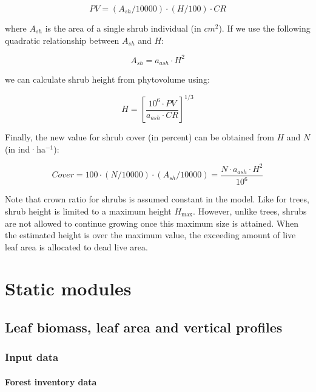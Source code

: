 \documentclass[]{book}
\begin{document}
\begin{equation}
PV =  (A_{sh}/10000) \cdot (H/100) \cdot CR
\end{equation}

where \(A_{sh}\) is the area of a single shrub individual (in \(cm^2\)).
If we use the following quadratic relationship between \(A_{sh}\) and
\(H\):

\begin{equation}
A_{sh} = a_{ash} \cdot H^2
\end{equation}

we can calculate shrub height from phytovolume using:

\begin{equation}
H = \left[\frac{10^6 \cdot PV}{a_{ash} \cdot CR}\right]^{1/3}
\end{equation}

Finally, the new value for shrub cover (in percent) can be obtained from
\(H\) and \(N\) (in ind·ha\(^{-1}\)):

\begin{equation}
Cover = 100 \cdot (N/10000) \cdot (A_{sh}/10000) = \frac{N \cdot a_{ash} \cdot H^2}{10^6}
\end{equation}

Note that crown ratio for shrubs is assumed constant in the model. Like
for trees, shrub height is limited to a maximum height \(H_{\max}\).
However, unlike trees, shrubs are not allowed to continue growing once
this maximum size is attained. When the estimated height is over the
maximum value, the exceeding amount of live leaf area is allocated to
dead live area.

\part{Static modules}\label{part-static-modules}

\chapter{Leaf biomass, leaf area and vertical
profiles}\label{leafbiomass}

\section{Input data}\label{input-data}

\subsection{Forest inventory data}\label{forest-inventory-data}
\end{document}
